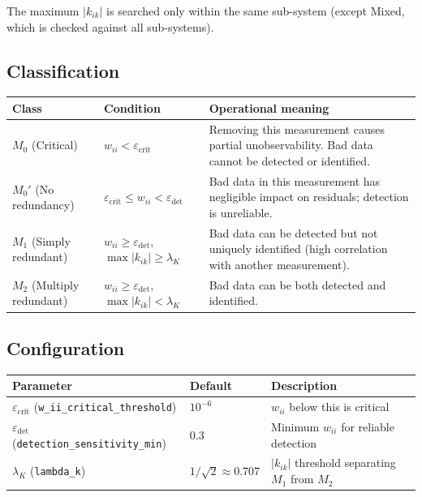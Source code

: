 \documentclass[11pt,a4paper]{article}
\begin{document}
\noindent
The maximum $|k_{ik}|$ is searched only within the same sub-system
(except Mixed, which is checked against all sub-systems).

\subsection{Classification}

\begin{center}
\small
\begin{tabular}{llp{45mm}}
  \toprule
  \textbf{Class} & \textbf{Condition} & \textbf{Operational meaning} \\
  \midrule
  $M_0$ (Critical) &
    $w_{ii} < \varepsilon_\text{crit}$ &
    Removing this measurement causes partial unobservability.  Bad data
    cannot be detected or identified. \\
  $M_0'$ (No redundancy) &
    $\varepsilon_\text{crit} \le w_{ii} < \varepsilon_\text{det}$ &
    Bad data in this measurement has negligible impact on residuals;
    detection is unreliable. \\
  $M_1$ (Simply redundant) &
    $w_{ii} \ge \varepsilon_\text{det}$,
    $\max|k_{ik}| \ge \lambda_K$ &
    Bad data can be detected but not uniquely identified (high
    correlation with another measurement). \\
  $M_2$ (Multiply redundant) &
    $w_{ii} \ge \varepsilon_\text{det}$,
    $\max|k_{ik}| < \lambda_K$ &
    Bad data can be both detected and identified. \\
  \bottomrule
\end{tabular}
\end{center}

\subsection{Configuration}

\begin{center}
\small
\begin{tabular}{llp{52mm}}
  \toprule
  \textbf{Parameter} & \textbf{Default} & \textbf{Description} \\
  \midrule
  $\varepsilon_\text{crit}$ (\texttt{w\_ii\_critical\_threshold})
    & $10^{-6}$ & $w_{ii}$ below this is critical \\
  $\varepsilon_\text{det}$ (\texttt{detection\_sensitivity\_min})
    & $0.3$ & Minimum $w_{ii}$ for reliable detection \\
  $\lambda_K$ (\texttt{lambda\_k})
    & $1/\sqrt{2} \approx 0.707$ & $|k_{ik}|$ threshold separating $M_1$ from $M_2$ \\
  \bottomrule
\end{tabular}
\end{center}
\end{document}
